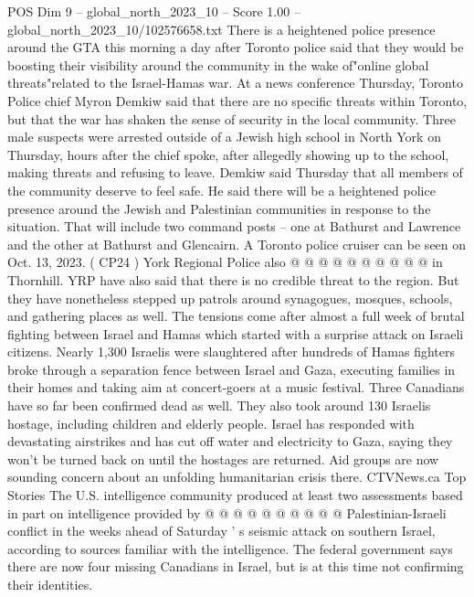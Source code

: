 \begin{textsample}{POS Dim 9 – global\_north\_2023\_10 – Score 1.00 – global\_north\_2023\_10/102576658.txt}  \label{ex:f9_pos_307}
There is a heightened police presence around the GTA this morning a day after Toronto police said that they would be boosting their visibility around the community in the wake of"online global threats"related to the Israel-Hamas war.
At a news conference Thursday, Toronto Police chief Myron Demkiw said that there are no specific threats within Toronto, but that the war has shaken the sense of security in the local community.
Three male suspects were arrested outside of a Jewish high school in North York on Thursday, hours after the chief spoke, after allegedly showing up to the school, making threats and refusing to leave.
Demkiw said Thursday that all members of the community deserve to feel safe.
He said there will be a heightened police presence around the Jewish and Palestinian communities in response to the situation.
That will include two command posts -- one at Bathurst and Lawrence and the other at Bathurst and Glencairn.
A Toronto police cruiser can be seen on Oct. 13, 2023. ( CP24 ) York Regional Police also @ @ @ @ @ @ @ @ @ @ in Thornhill.
YRP have also said that there is no credible threat to the region.
But they have nonetheless stepped up patrols around synagogues, mosques, schools, and gathering places as well.
The tensions come after almost a full week of brutal fighting between Israel and Hamas which started with a surprise attack on Israeli citizens.
Nearly 1,300 Israelis were slaughtered after hundreds of Hamas fighters broke through a separation fence between Israel and Gaza, executing families in their homes and taking aim at concert-goers at a music festival.
Three Canadians have so far been confirmed dead as well.
They also took around 130 Israelis hostage, including children and elderly people.
Israel has responded with devastating airstrikes and has cut off water and electricity to Gaza, saying they won't be turned back on until the hostages are returned.
Aid groups are now sounding concern about an unfolding humanitarian crisis there.
CTVNews.ca Top Stories The U.S. intelligence community produced at least two assessments based in part on intelligence provided by @ @ @ @ @ @ @ @ @ @ Palestinian-Israeli conflict in the weeks ahead of Saturday ' s seismic attack on southern Israel, according to sources familiar with the intelligence.
The federal government says there are now four missing Canadians in Israel, but is at this time not confirming their identities.

\end{textsample}
